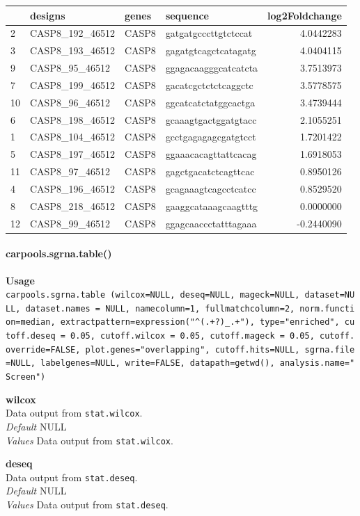 \documentclass[]{article}
\let\oldparagraph\paragraph
\renewcommand{\paragraph}[1]{\oldparagraph{#1}\mbox{}}
\begin{document}
\begin{longtable}[c]{@{}llllr@{}}
\toprule
& designs & genes & sequence & log2Foldchange\tabularnewline
\midrule
\endhead
2 & CASP8\_192\_46512 & CASP8 & gatgatgcccttgtctccat &
4.0442283\tabularnewline
3 & CASP8\_193\_46512 & CASP8 & gagatgtcagctcatagatg &
4.0404115\tabularnewline
9 & CASP8\_95\_46512 & CASP8 & ggagacaagggcatcatcta &
3.7513973\tabularnewline
7 & CASP8\_199\_46512 & CASP8 & gacatcgctctctcaggctc &
3.5778575\tabularnewline
10 & CASP8\_96\_46512 & CASP8 & ggcatcatctatggcactga &
3.4739444\tabularnewline
6 & CASP8\_198\_46512 & CASP8 & gcaaagtgactggatgtacc &
2.1055251\tabularnewline
1 & CASP8\_104\_46512 & CASP8 & gcctgagagagcgatgtcct &
1.7201422\tabularnewline
5 & CASP8\_197\_46512 & CASP8 & ggaaacacagttattcacag &
1.6918053\tabularnewline
11 & CASP8\_97\_46512 & CASP8 & gagctgacatctcagttcac &
0.8950126\tabularnewline
4 & CASP8\_196\_46512 & CASP8 & gcagaaagtcagcctcatcc &
0.8529520\tabularnewline
8 & CASP8\_218\_46512 & CASP8 & gaaggcataaagcaagtttg &
0.0000000\tabularnewline
12 & CASP8\_99\_46512 & CASP8 & ggagcaaccctatttagaaa &
-0.2440090\tabularnewline
\bottomrule
\end{longtable}

\paragraph{carpools.sgrna.table()}\label{carpools.sgrna.table}

\textbf{Usage}\\
\texttt{carpools.sgrna.table\ (wilcox=NULL,\ deseq=NULL,\ mageck=NULL,\ dataset=NULL,\ dataset.names\ =\ NULL,\ namecolumn=1,\ fullmatchcolumn=2,\ norm.function=median,\ extractpattern=expression("\^{}(.+?)\_.+"),\ type="enriched",\ cutoff.deseq\ =\ 0.05,\ cutoff.wilcox\ =\ 0.05,\ cutoff.mageck\ =\ 0.05,\ cutoff.override=FALSE,\ plot.genes="overlapping",\ cutoff.hits=NULL,\ sgrna.file=NULL,\ labelgenes=NULL,\ write=FALSE,\ datapath=getwd(),\ analysis.name="Screen")}

\textbf{wilcox}\\
Data output from \texttt{stat.wilcox}.\\
\emph{Default} NULL\\
\emph{Values} Data output from \texttt{stat.wilcox}.

\textbf{deseq}\\
Data output from \texttt{stat.deseq}.\\
\emph{Default} NULL\\
\emph{Values} Data output from \texttt{stat.deseq}.
\end{document}
